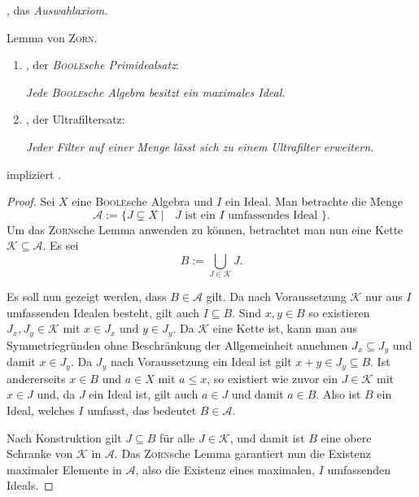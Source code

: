 \begin{defn}
 \item \AC, das \textit{Auswahlaxiom}.
 \item Lemma von \textsc{Zorn}.
\end{defn}

\begin{defn}
  \begin{enumerate}[(1)]
    \item \PIT, der \textit{\textsc{Boole}sche Primidealsatz}:
      \begin{addmargin}[2em]{2em}%
        \textit{Jede \textsc{Boole}sche Algebra besitzt ein maximales Ideal.}
      \end{addmargin}
    \item \UFT, der Ultrafiltersatz: 
      
      \begin{addmargin}[2em]{2em}%
        \textit{Jeder Filter auf einer Menge lässt sich zu einem Ultrafilter erweitern.}
      \end{addmargin}
  \end{enumerate}
\end{defn}

\begin{thm}
  \label{thm:acpit}
  \AC impliziert \PIT.
\end{thm}

\begin{proof}
  Sei $X$ eine \textsc{Boole}sche Algebra und $I$ ein Ideal. 
  Man betrachte die Menge
  \begin{displaymath}
    \mathcal{A} := \{J \subsetneq X \mid \text{ $J$ ist ein $I$ umfassendes Ideal } \}.
  \end{displaymath}
  Um das \textsc{Zorn}sche Lemma anwenden zu können, betrachtet man nun eine Kette $\mathcal{K} \subseteq \mathcal{A}$.
  Es sei 
  \begin{displaymath}
    B := \bigcup_{J \in \mathcal{K}} J.
  \end{displaymath}

  Es soll nun gezeigt werden, dass $B \in \mathcal{A}$ gilt.
  Da nach Voraussetzung $\mathcal{K}$ nur aus $I$ umfassenden Idealen besteht, gilt auch $I \subseteq B$.
  Sind $x,y \in B$ so existieren $J_x, J_y \in \mathcal{K}$ mit $x \in J_x$ und $y \in J_y$.
  Da $\mathcal{K}$ eine Kette ist, kann man aus Symmetriegründen ohne Beschränkung der Allgemeinheit annehmen $J_x \subseteq J_y$ und damit $x \in J_y$.
  Da $J_y$ nach Voraussetzung ein Ideal ist gilt $x + y \in J_y \subseteq B$.
  Ist andererseits $x \in B$ und $a \in X$ mit $a \leq x$, so existiert wie zuvor ein $J \in \mathcal{K}$ mit $x \in J$ und, da $J$ ein Ideal ist, gilt auch $a \in J$ und damit $a \in B$.
  Also ist $B$ ein Ideal, welches $I$ umfasst, das bedeutet $B \in \mathcal{A}$.

  Nach Konstruktion gilt $J \subseteq B$ für alle $J \in \mathcal{K}$, und damit ist $B$ eine obere Schranke von $\mathcal{K}$ in $\mathcal{A}$.
  Das \textsc{Zorn}sche Lemma garantiert nun die Existenz maximaler Elemente in $\mathcal{A}$, also die Existenz eines maximalen, $I$ umfassenden Ideals.
\end{proof}


